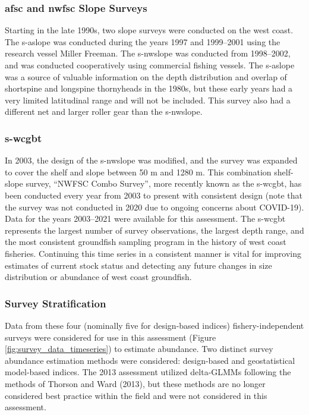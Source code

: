 \documentclass[11pt,
  english,
  letterpaper,
]{article}
\begin{document}
\hypertarget{and-slope-surveys}{%
\subsubsection{\texorpdfstring{\acrshort{afsc} and \acrshort{nwfsc} Slope Surveys}{ and  Slope Surveys}}\label{and-slope-surveys}}

Starting in the late 1990s, two slope surveys were conducted on the west coast. The \gls{s-aslope} was conducted during the years 1997 and 1999--2001 using the research vessel Miller Freeman. The \gls{s-nwslope} was conducted from 1998--2002, and was conducted cooperatively using commercial fishing vessels. The \gls{s-aslope} was a source of valuable information on the depth distribution and overlap of shortspine and longspine thornyheads in the 1980s, but these early years had a very limited latitudinal range and will not be included. This survey also had a different net and larger roller gear than the \gls{s-nwslope}.

\hypertarget{section-1}{%
\subsubsection{\texorpdfstring{\acrlong{s-wcgbt}}{}}\label{section-1}}

In 2003, the design of the \gls{s-nwslope} was modified, and the survey was expanded to cover the shelf and slope between 50 m and 1280 m. This combination shelf-slope survey, ``NWFSC Combo Survey'', more recently known as the \gls{s-wcgbt}, has been conducted every year from 2003 to present with consistent design (note that the survey was not conducted in 2020 due to ongoing concerns about COVID-19). Data for the years 2003--2021 were available for this assessment. The \gls{s-wcgbt} represents the largest number of survey observations, the largest depth range, and the most consistent groundfish sampling program in the history of west coast fisheries. Continuing this time series in a consistent manner is vital for improving estimates of current stock status and detecting any future changes in size distribution or abundance of west coast groundfish.

\hypertarget{survey-stratification}{%
\subsubsection{Survey Stratification}\label{survey-stratification}}

Data from these four (nominally five for design-based indices) fishery-independent surveys were considered for use in this assessment (Figure \ref{fig:survey_data_timeseries}) to estimate abundance. Two distinct survey abundance estimation methods were considered: design-based and geostatistical model-based indices. The 2013 assessment utilized delta-GLMMs following the methods of Thorson and Ward (2013), but these methods are no longer considered best practice within the field and were not considered in this assessment.
\end{document}
